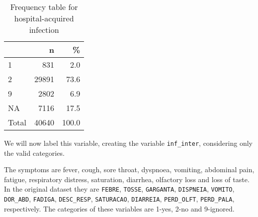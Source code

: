 \documentclass[
]{article}
\newenvironment{Shaded}{\begin{snugshade}}{\end{snugshade}}
\newcommand{\DataTypeTok}[1]{\textcolor[rgb]{0.13,0.29,0.53}{#1}}
\newcommand{\DecValTok}[1]{\textcolor[rgb]{0.00,0.00,0.81}{#1}}
\newcommand{\KeywordTok}[1]{\textcolor[rgb]{0.13,0.29,0.53}{\textbf{#1}}}
\newcommand{\NormalTok}[1]{#1}
\newcommand{\OperatorTok}[1]{\textcolor[rgb]{0.81,0.36,0.00}{\textbf{#1}}}
\newcommand{\OtherTok}[1]{\textcolor[rgb]{0.56,0.35,0.01}{#1}}
\newcommand{\StringTok}[1]{\textcolor[rgb]{0.31,0.60,0.02}{#1}}
\begin{document}
\begin{table}[!h]

\caption{\label{tab:unnamed-chunk-53}Frequency table for hospital-acquired infection}
\centering
\begin{tabular}[t]{l|r|r}
\hline
  & n & \%\\
\hline
1 & 831 & 2.0\\
\hline
2 & 29891 & 73.6\\
\hline
9 & 2802 & 6.9\\
\hline
NA & 7116 & 17.5\\
\hline
Total & 40640 & 100.0\\
\hline
\end{tabular}
\end{table}

We will now label this variable, creating the variable
\texttt{inf\_inter}, considering only the valid categories.

\begin{Shaded}
\end{Shaded}

The symptoms are fever, cough, sore throat, dyspnoea, vomiting,
abdominal pain, fatigue, respiratory distress, saturation, diarrhea,
olfactory loss and loss of taste. In the original dataset they are
\texttt{FEBRE}, \texttt{TOSSE}, \texttt{GARGANTA}, \texttt{DISPNEIA},
\texttt{VOMITO}, \texttt{DOR\_ABD}, \texttt{FADIGA},
\texttt{DESC\_RESP}, \texttt{SATURACAO}, \texttt{DIARREIA},
\texttt{PERD\_OLFT}, \texttt{PERD\_PALA}, respectively. The categories
of these variables are 1-yes, 2-no and 9-ignored.

\begin{Shaded}
\end{Shaded}
\end{document}
